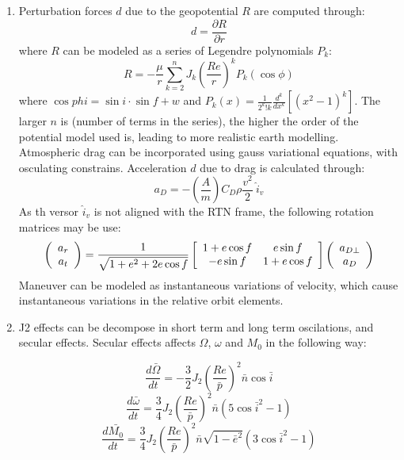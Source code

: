 \documentclass[a4paper]{article}
\begin{document}
\begin{enumerate}[label=\emph{\alph*)}]
  \item %
    Perturbation forces $d$ due to the geopotential $R$ are computed through:
    \[ d = \frac{\partial R}{\partial r}\]
    where $R$ can be modeled as a series of Legendre polynomials $P_k$:
    \[ R = -\frac{\mu}{r} \sum_{k=2}^{n}{J_k \left( \frac{Re}{r} \right)^k P_k(\cos{\phi})}\]
    where $\cos{phi}=\sin{i}\cdot\sin{f+w}$ and $P_k(x) = \frac{1}{2^k !k}\frac{d^k}{dx^k}\left[(x^2-1)^k\right]$. The larger $n$ is (number of terms in the series), the higher the order of the potential model used is, leading to more realistic earth modelling.\\
    Atmospheric drag can be incorporated using gauss variational equations, with osculating constrains. Acceleration $d$ due to drag is calculated through:
    \[ a_D = -\left(\frac{A}{m} \right) C_D \rho \frac{v^2}{2}~\hat{i}_v \]
    As th versor $\hat{i}_v$ is not aligned with the RTN frame, the following rotation matrices may be use:
    \[ \left( \begin{array}{c} a_r \\ a_t \end{array} \right) = \frac{1}{\sqrt{1+e^2+2e\cos{f}}} \left[ \begin{array}{c c} 1+e\cos{f} & e\sin{f} \\ -e\sin{f}  & 1+e\cos{f} \end{array} \right]  \left( \begin{array}{c} a_{D\perp} \\  a_D \end{array} \right) \]
    Maneuver can be modeled as instantaneous variations of velocity, which cause instantaneous variations in the relative orbit elements.
  \item %
    J2 effects can be decompose in short term and long term oscilations, and secular effects. Secular effects affects $\Omega$, $\omega$ and $M_0$ in the following way:
    \begin{minipage}{\textwidth}
      \begin{flushleft}
	\[ \frac{d\bar{\Omega}}{dt} = -\frac{3}{2} J_2 \left( \frac{Re}{\bar{p}} \right)^2 \bar{n} \cos{\bar{i}} \]
	\[ \frac{d\bar{\omega}}{dt} = \frac{3}{4} J_2 \left( \frac{Re}{\bar{p}}\right)^2  \bar{n} (5\cos{\bar{i}}^2 -1) \]
	\[ \frac{d\bar{M_0}}{dt} = \frac{3}{4} J_2 \left( \frac{Re}{\bar{p}}\right)^2  \bar{n} \sqrt{1-\bar{e}^2} (3\cos{\bar{i}}^2 -1) \]
      \end{flushleft}
    \end{minipage}


\end{enumerate}
\end{document}
